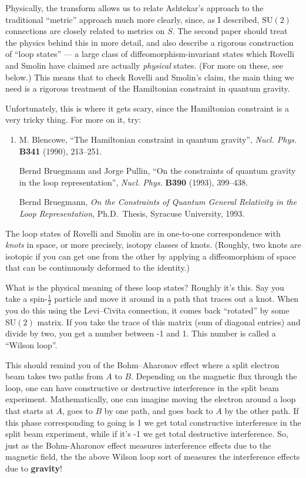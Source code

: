 \documentclass[12pt]{article}
\begin{document}
Physically, the transform allows us to relate Ashtekar's approach to the
traditional ``metric'' approach much more clearly, since, as I
described, \(\mathrm{SU}(2)\) connections are closely related to metrics
on \(S\). The second paper should treat the physics behind this in more
detail, and also describe a rigorous construction of ``loop states'' ---
a large class of diffeomorphism-invariant states which Rovelli and
Smolin have claimed are actually \emph{physical} states. (For more on
these, see below.) This means that to check Rovelli and Smolin's claim,
the main thing we need is a rigorous treatment of the Hamiltonian
constraint in quantum gravity.

Unfortunately, this is where it gets scary, since the Hamiltonian
constraint is a very tricky thing. For more on it, try:

\begin{enumerate}
\def\labelenumi{\arabic{enumi})}
\setcounter{enumi}{2}
\item
  M. Blencowe, ``The Hamiltonian constraint in quantum gravity'', 
  \emph{Nucl. Phys.} \textbf{B341} (1990), 213--251.

  Bernd Bruegmann and Jorge Pullin, ``On the constraints of quantum gravity 
  in the loop representation'', \emph{Nucl. Phys.} \textbf{B390}
  (1993), 399--438.

  Bernd Bruegmann, \emph{On the Constraints of Quantum General Relativity in 
  the Loop Representation},  Ph.D.~Thesis, Syracuse University, 1993.
\end{enumerate}

The loop states of Rovelli and Smolin are in one-to-one correspondence
with \emph{knots} in space, or more precisely, isotopy classes of knots.
(Roughly, two knots are isotopic if you can get one from the other by
applying a diffeomorphism of space that can be continuously deformed to
the identity.)

What is the physical meaning of these loop states? Roughly it's this.
Say you take a spin-\(\frac12\) particle and move it around in a path
that traces out a knot. When you do this using the Levi--Civita
connection, it comes back ``rotated'' by some \(\mathrm{SU}(2)\) matrix.
If you take the trace of this matrix (sum of diagonal entries) and
divide by two, you get a number between -1 and 1. This number is called
a ``Wilson loop''.

This should remind you of the Bohm--Aharonov effect where a split
electron beam takes two paths from \(A\) to \(B\). Depending on the
magnetic flux through the loop, one can have constructive or destructive
interference in the split beam experiment. Mathematically, one can
imagine moving the electron around a loop that starts at \(A\), goes to
\(B\) by one path, and goes back to \(A\) by the other path. If this
phase corresponding to going is 1 we get total constructive interference
in the split beam experiment, while if it's -1 we get total destructive
interference. So, just as the Bohm-Aharonov effect measures interference
effects due to the magnetic field, the the above Wilson loop sort of
measures the interference effects due to \textbf{gravity}!
\end{document}
